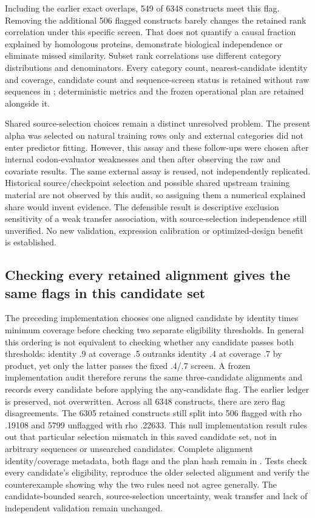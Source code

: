 Including the earlier exact overlaps, 549 of 6348 constructs meet this flag. Removing the additional 506 flagged constructs barely changes the retained rank correlation under this specific screen. That does not quantify a causal fraction explained by homologous proteins, demonstrate biological independence or eliminate missed similarity. Subset rank correlations use different category distributions and denominators. Every category count, nearest-candidate identity and coverage, candidate count and sequence-screen status is retained without raw sequences in ; deterministic metrics and the frozen operational plan are retained alongside it.


Shared source-selection choices remain a distinct unresolved problem. The present alpha was selected on natural training rows only and external categories did not enter predictor fitting. However, this assay and these follow-ups were chosen after internal codon-evaluator weaknesses and then after observing the raw and covariate results. The same external assay is reused, not independently replicated. Historical source/checkpoint selection and possible shared upstream training material are not observed by this audit, so assigning them a numerical explained share would invent evidence. The defensible result is descriptive exclusion sensitivity of a weak transfer association, with source-selection independence still unverified. No new validation, expression calibration or optimized-design benefit is established.

\subsection{Checking every retained alignment gives the same flags in this candidate set}
The preceding implementation chooses one aligned candidate by identity times minimum coverage before checking two separate eligibility thresholds. In general this ordering is not equivalent to checking whether any candidate passes both thresholds: identity .9 at coverage .5 outranks identity .4 at coverage .7 by product, yet only the latter passes the fixed .4/.7 screen. A frozen implementation audit therefore reruns the same three-candidate alignments and records every candidate before applying the any-candidate flag. The earlier ledger is preserved, not overwritten.
Across all 6348 constructs, there are zero flag disagreements. The 6305 retained constructs still split into 506 flagged with rho .19108 and 5799 unflagged with rho .22633. This null implementation result rules out that particular selection mismatch in this saved candidate set, not in arbitrary sequences or unsearched candidates. Complete alignment identity/coverage metadata, both flags and the plan hash remain in . Tests check every candidate's eligibility, reproduce the older selected alignment and verify the counterexample showing why the two rules need not agree generally. The candidate-bounded search, source-selection uncertainty, weak transfer and lack of independent validation remain unchanged.

